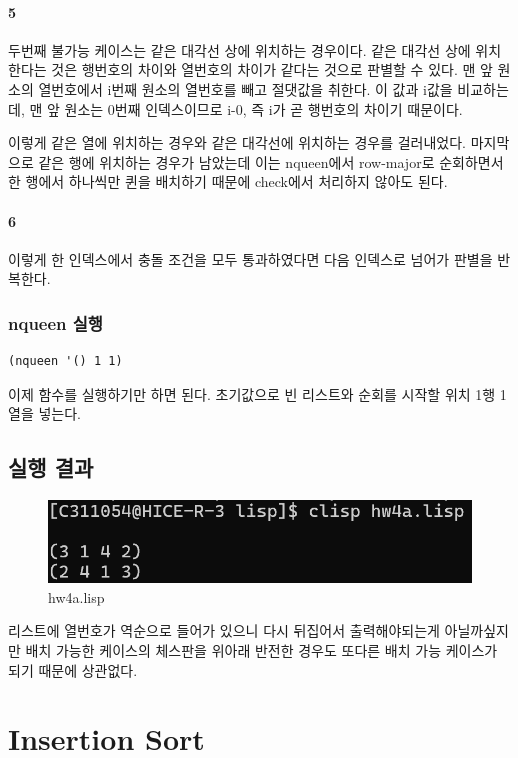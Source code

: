 \documentclass{oblivoir}
\begin{document}
\paragraph*{5}
두번째 불가능 케이스는 같은 대각선 상에 위치하는 경우이다. 같은 대각선 상에 위치한다는 것은 행번호의 차이와 열번호의 차이가 같다는 것으로 판별할 수 있다. 맨 앞 원소의 열번호에서 i번째 원소의 열번호를 빼고 절댓값을 취한다. 이 값과 i값을 비교하는데, 맨 앞 원소는 0번째 인덱스이므로 i-0, 즉 i가 곧 행번호의 차이기 때문이다. 

이렇게 같은 열에 위치하는 경우와 같은 대각선에 위치하는 경우를 걸러내었다. 마지막으로 같은 행에 위치하는 경우가 남았는데 이는 nqueen에서 row-major로 순회하면서 한 행에서 하나씩만 퀸을 배치하기 때문에 check에서 처리하지 않아도 된다.

\paragraph*{6}
이렇게 한 인덱스에서 충돌 조건을 모두 통과하였다면 다음 인덱스로 넘어가 판별을 반복한다.

\subsubsection{nqueen 실행}
\begin{verbatim}
(nqueen '() 1 1)
\end{verbatim}
이제 함수를 실행하기만 하면 된다.
초기값으로 빈 리스트와 순회를 시작할 위치 1행 1열을 넣는다.

\subsection{실행 결과}
\begin{figure}[h]
    \centering
    \includegraphics[width=0.5\linewidth]{hw4a.png}
    \caption{hw4a.lisp}
    \label{fig:fig1}
\end{figure}

리스트에 열번호가 역순으로 들어가 있으니 다시 뒤집어서 출력해야되는게 아닐까싶지만 배치 가능한 케이스의 체스판을 위아래 반전한 경우도 또다른 배치 가능 케이스가 되기 때문에 상관없다.

\section{Insertion Sort}
\end{document}

